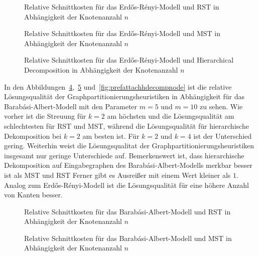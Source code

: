 \begin{figure}[H]
    \centering
    
    \caption{Relative Schnittkosten für das Erdős-Rényi-Modell und RST in Abhängigkeit der Knotenanzahl $n$\label{fig:edgeprobrstnode}}
\end{figure}

\begin{figure}[H]
    \centering
    
    \caption{Relative Schnittkosten für das Erdős-Rényi-Modell und MST in Abhängigkeit der Knotenanzahl $n$\label{fig:edgeprobmstnode}}
\end{figure}

\begin{figure}[H]
    \centering
    
    \caption{Relative Schnittkosten für das Erdős-Rényi-Modell und Hierarchical Decomposition in Abhängigkeit der Knotenanzahl $n$\label{fig:edgeprobhdecompnode}}
\end{figure}


In den Abbildungen~\ref{fig:prefattachrstnode},~\ref{fig:prefattachmstnode} und~\ref{fig:prefattachhdecompnode} ist die relative Lösungsqualität der Graphpartitionierungsheuristiken in Abhängigkeit für das Barabási-Albert-Modell mit den Parameter $m=5$ und $m=10$ zu sehen.
Wie vorher ist die Streuung für $k=2$ am höchsten und die Lösungsqualität am schlechtesten für RST und MST, während die Lösungsqualität für hierarchische Dekomposition bei $k=2$ am besten ist.
Für $k=2$ und $k=4$ ist der Unterschied gering.
Weiterhin weist die Lösungsqualitat der Graphpartitionierungsheuristiken insgesamt nur geringe Unterschiede auf.
Bemerkenswert ist, dass hierarchische Dekomposition auf Eingabegraphen des Barabási-Albert-Modells merkbar besser ist als MST und RST
Ferner gibt es Ausreißer mit einem Wert kleiner als $1$.
Analog zum Erdős-Rényi-Modell ist die Lösungsqualität für eine höhere Anzahl von Kanten besser.

\begin{figure}[H]
    \centering
    
    \caption{Relative Schnittkosten für das Barabási-Albert-Modell und RST in Abhängigkeit der Knotenanzahl $n$\label{fig:prefattachrstnode}}
\end{figure}

\begin{figure}[H]
    \centering
    
    \caption{Relative Schnittkosten für das Barabási-Albert-Modell und MST in Abhängigkeit der Knotenanzahl $n$\label{fig:prefattachmstnode}}
\end{figure}


